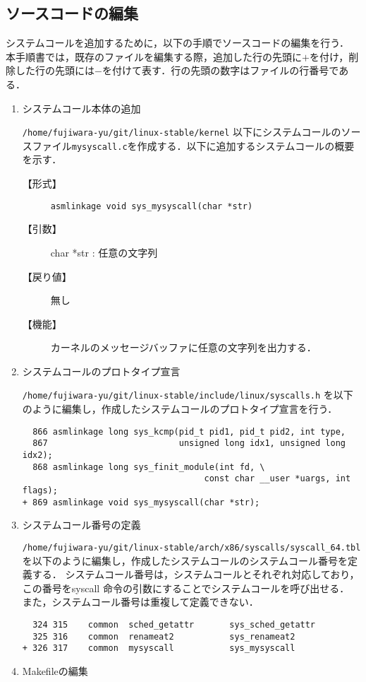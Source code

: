 \documentclass[12pt]{jsarticle}
\begin{document}
\subsection{ソースコードの編集}
システムコールを追加するために，以下の手順でソースコードの編集を行う．
本手順書では，既存のファイルを編集する際，追加した行の先頭に$+$を付け，削除した行の先頭には$-$を付けて表す．行の先頭の数字はファイルの行番号である．
\begin{enumerate}

\item システムコール本体の追加

\verb|/home/fujiwara-yu/git/linux-stable/kernel| 以下にシステムコールのソースファイル\verb|mysyscall.c|を作成する．以下に追加するシステムコールの概要を示す．
\begin{description}
\item[【形式】]\verb|asmlinkage void sys_mysyscall(char *str)|

\item[【引数】]char *str : 任意の文字列

\item [【戻り値】]無し

\item [【機能】]カーネルのメッセージバッファに任意の文字列を出力する．

\end{description}

\item システムコールのプロトタイプ宣言

\verb|/home/fujiwara-yu/git/linux-stable/include/linux/syscalls.h| を以下のように編集し，作成したシステムコールのプロトタイプ宣言を行う．
\begin{spacing}{0.7}
\begin{verbatim}
  866 asmlinkage long sys_kcmp(pid_t pid1, pid_t pid2, int type,
  867                          unsigned long idx1, unsigned long idx2);
  868 asmlinkage long sys_finit_module(int fd, \ 
                                    const char __user *uargs, int flags);
+ 869 asmlinkage void sys_mysyscall(char *str);
\end{verbatim}
\end{spacing}
\item システムコール番号の定義

\verb|/home/fujiwara-yu/git/linux-stable/arch/x86/syscalls/syscall_64.tbl| を以下のように編集し，作成したシステムコールのシステムコール番号を定義する．
システムコール番号は，システムコールとそれぞれ対応しており，この番号をsyscall 命令の引数にすることでシステムコールを呼び出せる．
また，システムコール番号は重複して定義できない．
\begin{spacing}{0.7}
\begin{verbatim}
  324 315    common  sched_getattr       sys_sched_getattr
  325 316    common  renameat2           sys_renameat2
+ 326 317    common  mysyscall           sys_mysyscall
\end{verbatim}
\end{spacing}
\item Makefileの編集


\end{enumerate}
\end{document}
